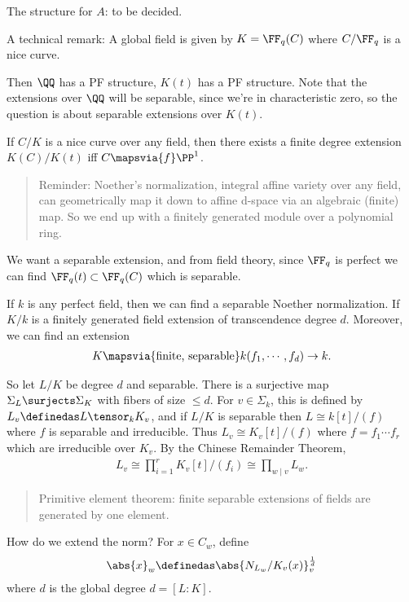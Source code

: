 The structure for \(A\): to be decided.

A technical remark: A global field is given by \(K = \FF_q(C)\) where
\(C/\FF_q\) is a nice curve.

Then \(\QQ\) has a PF structure, \(K(t)\) has a PF structure. Note that
the extensions over \(\QQ\) will be separable, since we're in
characteristic zero, so the question is about separable extensions over
\(K(t)\).

If \(C/K\) is a nice curve over any field, then there exists a finite
degree extension \(K(C) / K(t)\) iff \(C \mapsvia{f} \PP^1\).

\begin{quote}
Reminder: Noether's normalization, integral affine variety over any
field, can geometrically map it down to affine d-space via an algebraic
(finite) map. So we end up with a finitely generated module over a
polynomial ring.
\end{quote}

We want a separable extension, and from field theory, since \(\FF_q\) is
perfect we can find \(\FF_q(t) \subset \FF_q(C)\) which is separable.

If \(k\) is any perfect field, then we can find a separable Noether
normalization. If \(K/k\) is a finitely generated field extension of
transcendence degree \(d\). Moreover, we can find an extension
\begin{align*}
K \mapsvia{\text{finite, separable}} k(f_1, \cdots, f_d) \to k
.\end{align*}

So let \(L/K\) be degree \(d\) and separable. There is a surjective map
\(\Sigma_L \surjects \Sigma_K\) with fibers of size \(\leq d\). For
\(v\in \Sigma_k\), this is defined by \(L_v\definedas L \tensor_k K_v\),
and if \(L/K\) is separable then \(L \cong k[t]/(f)\) where \(f\) is
separable and irreducible. Thus \(L_v \cong K_v[t] / (f)\) where
\(f = f_1 \cdots f_r\) which are irreducible over \(K_v\). By the
Chinese Remainder Theorem,
\begin{align*}L_v \cong \prod_{i=1}^r K_v[t] / (f_i) \cong \prod_{w \mid v} L_w.\end{align*}

\begin{quote}
Primitive element theorem: finite separable extensions of fields are
generated by one element.
\end{quote}

How do we extend the norm? For \(x\in C_w\), define
\begin{align*}
\abs{x}_w \definedas \abs{ N_{L_w}/ K_v (x) }_v^{\frac 1 d}
\end{align*} where \(d\) is the global degree \(d = [L : K]\).

